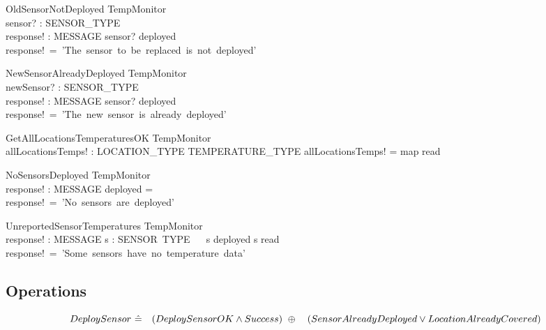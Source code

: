 \documentclass[12pt]{article}
\begin{document}
		
		
		\begin{schema}{OldSensorNotDeployed}
			\Xi TempMonitor\\
			sensor? : SENSOR\_TYPE\\
			response! : MESSAGE
			\where
			sensor? \notin deployed\\
			response!~=~'The~sensor~to~be~replaced~is~not~deployed'
		\end{schema}
		
		
		
		\begin{schema}{NewSensorAlreadyDeployed}
			\Xi TempMonitor\\
			newSensor? : SENSOR\_TYPE\\
			response! : MESSAGE
			\where
			sensor? \in deployed\\
			response!~=~'The~new~sensor~is~already~deployed'
		\end{schema}

		
		\begin{schema}{GetAllLocationsTemperaturesOK}
			\Xi TempMonitor\\
			allLocationsTemps! : LOCATION\_TYPE \rel TEMPERATURE\_TYPE
			\where
			allLocationsTemps! = map \dres read
		\end{schema}
		
		
		
		\begin{schema}{NoSensorsDeployed}
			\Xi TempMonitor\\
			response! : MESSAGE
			\where
			deployed = \emptyset \\
			response!~=~'No~sensors~are~deployed'
		\end{schema}
		
		
		
		\begin{schema}{UnreportedSensorTemperatures}
			\Xi TempMonitor\\
			response! : MESSAGE
			\where
			\exists s : SENSOR\ TYPE \  \ s \in deployed \land s \notin \dom read\\
			response!~=~'Some~sensors~have~no~temperature~data'
		\end{schema}
		
		\subsection{Operations}
		
		\[ DeploySensor~\hat{=}~\\
		~~~(DeploySensorOK \wedge Success)~ \oplus\\
		~~~(SensorAlreadyDeployed \vee LocationAlreadyCovered) \]
		
\end{document}
